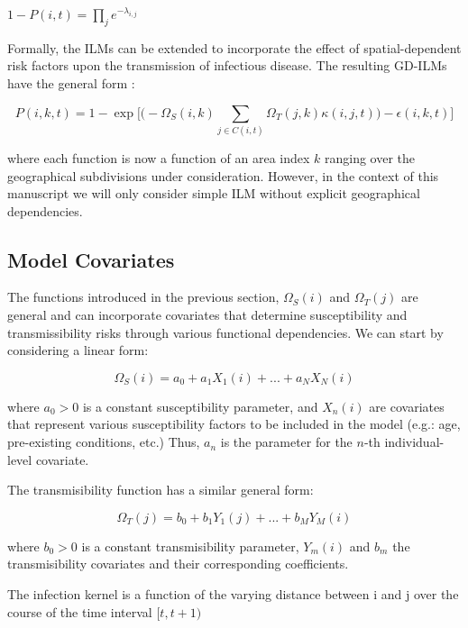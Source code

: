 \documentclass{article}
\begin{document}
\begin{center}
$1-P(i, t)= \prod\limits_{j}e^{ - \lambda_{i,j} }$
\end{center}

Formally, the ILMs can be extended to incorporate the effect of spatial-dependent risk factors upon the transmission of infectious disease. The resulting GD-ILMs have the general form \cite{Mahsin2020}:

\begin{equation}
P(i, k, t)=1-\exp\big[ \big( -\Omega_{S}(i, k) \sum\limits_{j \in C(i, t)} \Omega_{T}(j, k) \kappa(i, j, t)\big) - \epsilon(i, k, t)\big]
\end{equation}

where each function is now a function of an area index $k$ ranging over the geographical subdivisions under consideration. However, in the context of this manuscript we will only consider simple ILM without explicit geographical dependencies.

\subsection{Model Covariates}

The functions introduced in the previous section, $\Omega_{S}(i)$ and $\Omega_{T}(j)$ are general and can incorporate covariates that determine susceptibility and transmissibility risks through various functional dependencies. We can start by considering a linear form:

\begin{equation}
\Omega_{S}(i)=a_{0} + a_{1} X_{1}(i) + ... + a_{N} X_{N}(i)
\end{equation}

where $a_0>0$ is a constant susceptibility parameter, and $X_{n}(i)$ are covariates that represent various susceptibility factors to be included in the model (e.g.: age, pre-existing conditions, etc.) Thus, $a_{n}$ is the parameter for the $n$-th individual-level covariate.

The transmisibility function has a similar general form:

\begin{equation}
\Omega_{T}(j)=b_{0} + b_{1} Y_{1}(j) + ... + b_{M} Y_{M}(i)
\end{equation}

where $b_0>0$ is a constant transmisibility parameter, $Y_{m}(i)$ and $b_{m}$ the transmisibility covariates and their corresponding coefficients.

The infection kernel is a function of the varying distance between i and j over the course of the time interval $[t, t + 1)$
\end{document}
